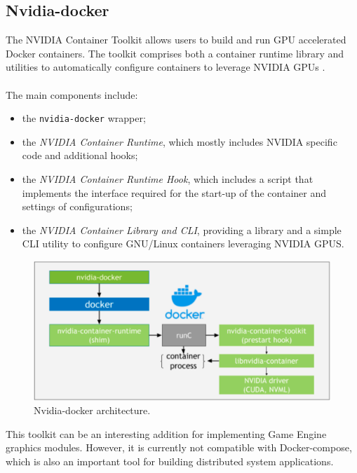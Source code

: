 \subsection{Nvidia-docker}
The NVIDIA Container Toolkit allows users to build and run GPU accelerated Docker containers. The toolkit comprises both a container runtime library and utilities to automatically configure containers to leverage NVIDIA GPUs \cite{site:nvidia-docker-doc}. \\ \\
The main components \cite{site:nvidia-docker-repo} include:
\begin{itemize}
	\item the \texttt{nvidia-docker} wrapper;
	\item the \textit{NVIDIA Container Runtime}, which mostly includes NVIDIA specific code and additional hooks;
	\item the\textit{ NVIDIA Container Runtime Hook}, which includes a script that implements the interface required for the start-up of the container and settings of configurations;
	\item the \textit{NVIDIA Container Library and CLI}, providing a library and a simple CLI utility to configure GNU/Linux containers leveraging NVIDIA GPUS.
\end{itemize}
\begin{figure}[h!]
	\centering
	\includegraphics[width=0.9\linewidth]{immagini/Technologies/nvidia-docker-arch-new}
	\caption[Nvidia-docker architecture.]{Nvidia-docker architecture.}
	\label{fig:nvidia-docker-arch-new}
\end{figure}
This toolkit can be an interesting addition for implementing Game Engine graphics modules. However, it is currently not compatible with Docker-compose, which is also an important tool for building distributed system applications.

